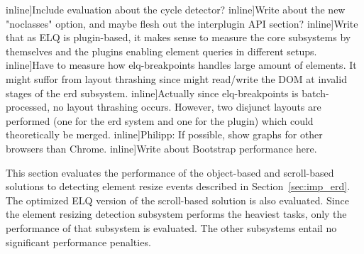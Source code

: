\documentclass{acm_proc_article-sp}
\newcommand{\gls}[1]{#1}
\newcommand{\todo}[1]{}
\begin{document}
    \todo[inline]{Include evaluation about the cycle detector?}
    \todo[inline]{Write about the new "noclasses" option, and maybe flesh out the interplugin API section?}
    \todo[inline]{Write that as ELQ is plugin-based, it makes sense to measure the core subsystems by themselves and the plugins enabling element queries in different setups.}
    \todo[inline]{Have to measure how elq-breakpoints handles large amount of elements. It might suffor from layout thrashing since might read/write the DOM at invalid stages of the erd subsystem.}
    \todo[inline]{Actually since elq-breakpoints is batch-processed, no layout thrashing occurs. However, two disjunct layouts are performed (one for the erd system and one for the plugin) which could theoretically be merged.}
    \todo[inline]{Philipp: If possible, show graphs for other browsers than Chrome.}
    \todo[inline]{Write about Bootstrap performance here.}

    
      This section evaluates the performance of the object-based and scroll-based solutions to detecting \gls{element} resize events described in Section~\ref{sec:imp_erd}.
      The optimized \gls{ELQ} version of the scroll-based solution is also evaluated.
      Since the element resizing detection subsystem performs the heaviest tasks, only the performance of that subsystem is evaluated.
      The other subsystems entail no significant performance penalties.
      \todo{Remove this, and analyze the different subsystems in detail: erd, cycle detector, elq-breakpoints, etc.}
\end{document}
